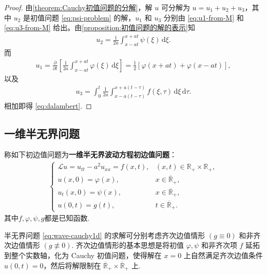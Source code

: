 \documentclass[../../main.tex]{subfiles}%
\begin{document}
\begin{proof}
由\cref{theorem:Cauchy初值问题的分解}，解 $u$ 可分解为 $u=u_1+u_2+u_3$，其中 $u_2$ 是初值问题 \eqref{eq:psi-problem} 的解，$u_1$ 和 $u_3$ 分别由 \eqref{eq:u1-from-M} 和 \eqref{eq:u3-from-M} 给出。由\cref{proposition:初值问题的解的表示}知
\begin{align*}
u_2=\frac{1}{2a}\int_{x-at}^{x+at}\psi(\xi)\,\mathrm{d}\xi.
\end{align*}
而
\begin{align*}
u_1=\frac{\partial}{\partial t}\left[\frac{1}{2a}\int_{x-at}^{x+at}\varphi(\xi)\,\mathrm{d}\xi\right]
=\frac{1}{2}[\varphi(x+at)+\varphi(x-at)],
\end{align*}
以及
\begin{align*}
u_3=\int_0^t \frac{1}{2a}\int_{x-a(t-\tau)}^{x+a(t-\tau)}f(\xi,\tau)\,\mathrm{d}\xi\,\mathrm{d}\tau.
\end{align*}
相加即得 \eqref{eq:dalambert}.
\end{proof}


\subsection{一维半无界问题}

\begin{definition}
称如下初边值问题为\textbf{一维半无界波动方程初边值问题}：
\begin{align}
\begin{cases}
\mathcal{L}u=u_{tt}-a^2u_{xx}=f(x,t), & (x,t)\in\mathbb{R}_+\times\mathbb{R}_+, \\
u(x,0)=\varphi(x), & x\in\overline{\mathbb{R}}_+, \\
u_t(x,0)=\psi(x), & x\in\overline{\mathbb{R}}_+, \\
u(0,t)=g(t), & t\in\overline{\mathbb{R}}_+.
\end{cases} \label{eq:wave-cauchy1d}
\end{align}
其中$f,\varphi,\psi,g$都是已知函数.
\end{definition}
\begin{remark}
半无界问题 \eqref{eq:wave-cauchy1d} 的求解可分别考虑齐次边值情形 $(g\equiv 0)$ 和非齐次边值情形 $(g\not\equiv 0)$. 齐次边值情形的基本思想是将初值 $\varphi,\psi$ 和非齐次项 $f$ 延拓到整个实数轴，化为 Cauchy 初值问题，使得解在 $x=0$ 上自然满足齐次边值条件 $u(0,t)=0$，然后将解限制在 $\overline{\mathbb{R}}_+\times\overline{\mathbb{R}}_+$ 上.
\end{remark}
\end{document}
